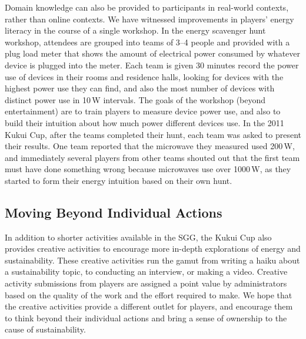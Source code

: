 \documentclass[10pt, conference, compsocconf]{IEEEtran-old}
\begin{document}
Domain knowledge can also be provided to participants in real-world contexts, rather than online contexts. We have witnessed improvements in players' energy literacy in the course of a single workshop. In the energy scavenger hunt workshop, attendees are grouped into teams of 3--4 people and provided with a plug load meter that shows the amount of electrical power consumed by whatever device is plugged into the meter. Each team is given 30 minutes record the power use of devices in their rooms and residence halls, looking for devices with the highest power use they can find, and also the most number of devices with distinct power use in 10\,W intervals. The goals of the workshop (beyond entertainment) are to train players to measure device power use, and also to build their intuition about how much power different devices use. In the 2011 Kukui Cup, after the teams completed their hunt, each team was asked to present their results. One team reported that the microwave they measured used 200\,W, and immediately several players from other teams shouted out that the first team must have done something wrong because microwaves use over 1000\,W, as they started to form their energy intuition based on their own hunt.


\subsection{Moving Beyond Individual Actions}

In addition to shorter activities available in the SGG, the Kukui Cup also provides creative activities to encourage more in-depth explorations of energy and sustainability. These creative activities run the gamut from writing a haiku about a sustainability topic, to conducting an interview, or making a video. Creative activity submissions from players are assigned a point value by administrators based on the quality of the work and the effort required to make. We hope that the creative activities provide a different outlet for players, and encourage them to think beyond their individual actions and bring a sense of ownership to the cause of sustainability.
\end{document}
